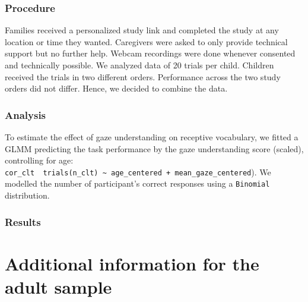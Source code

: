 \documentclass[
  man,floatsintext]{apa6}
\begin{document}
\hypertarget{procedure}{%
\subsubsection{Procedure}\label{procedure}}

Families received a personalized study link and completed the study at any location or time they wanted. Caregivers were asked to only provide technical support but no further help. Webcam recordings were done whenever consented and technically possible. We analyzed data of 20 trials per child. Children received the trials in two different orders. Performance across the two study orders did not differ. Hence, we decided to combine the data.

\hypertarget{analysis-1}{%
\subsubsection{Analysis}\label{analysis-1}}

To estimate the effect of gaze understanding on receptive vocabulary, we fitted a GLMM predicting the task performance by the gaze understanding score (scaled), controlling for age: \texttt{cor\_clt\ \textbar{}\ trials(n\_clt)\ \textasciitilde{}\ age\_centered\ +\ mean\_gaze\_centered}). We modelled the number of participant's correct responses using a \texttt{Binomial} distribution.

\hypertarget{results-1}{%
\subsubsection{Results}\label{results-1}}

\begin{table}[H]
\centering
{}
\end{table}

\newpage

\hypertarget{additional-information-for-the-adult-sample}{%
\section{Additional information for the adult sample}\label{additional-information-for-the-adult-sample}}
\end{document}
